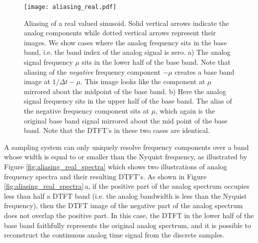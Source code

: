 
\begin{figure*}[h]
  \begin{centering}
    \texttt{[image: aliasing\_real.pdf]}
  \par\end{centering}
  \caption{Aliasing of a real valued sinusoid.
Solid vertical arrows indicate the analog components while dotted vertical arrows represent their images.
We show cases where the analog frequency sits in the base band, i.e. the band index of the analog signal is zero.
a) The analog signal frequency $\mu$ sits in the lower half of the base band.
Note that aliasing of the \emph{negative} frequency component $-\mu$ creates a base band image at $1/\Delta t - \mu$.
This image looks like the component at $\mu$ mirrored about the midpoint of the base band.
b) Here the analog signal frequency sits in the upper half of the base band.
The alias of the negative frequency component sits at $\mu$, which again is the original base band signal mirrored about the mid point of the base band.
Note that the DTFT's in these two cases are identical.}
  \label{fig:aliasing_real}
\end{figure*}

A sampling system can only uniquely resolve frequency components over a band whose width is equal to or smaller than the Nyquist frequency, as illustrated by Figure \ref{fig:aliasing_real_spectra} which shows two illustrations of analog frequency spectra and their resulting DTFT's.
As shown in Figure \ref{fig:aliasing_real_spectra}\,a, if the positive part of the analog spectrum occupies less than half a DTFT band (i.e. the analog bandwidth is less than the Nyquist frequency), then the DTFT image of the negative part of the analog spectrum does not overlap the positive part.
In this case, the DTFT in the lower half of the base band faithfully represents the original analog spectrum, and it is possible to reconstruct the continuous analog time signal from the discrete samples.

